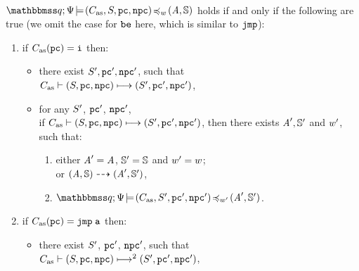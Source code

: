 \begin{definition}
    \label{def:siminsseq}
    \mbox{} \\
    {\em $\simInsSeq{\relastQ}{\Cspec}{(\asmimp, \state, \pc, \npc)}
        {\word}{(\primcom, \hpstate)}$} holds if and only if
    the following are true
    (we omit the case
    for {\em $\be$} here, which is similar to {\em $\jmp$}):

    \small
    \begin{enumerate}[1.]
		\item if {\em $\asmimp(\pc) = \simplins$} then:
		\begin{itemize}
			\item
			there exist {\em $\state', \pc', \npc'$}, such that \\
			{\em $\lptrans{\asmimp}{(\state, \pc, \npc)}{(\state', \pc', \npc')}$},
			
			\item
			for any {\em $\state'$}, {\em $\pc'$}, {\em $\npc'$}, \\ if
            {\em $\lptrans{\asmimp}{(\state, \pc, \npc)}{(\state', \pc', \npc')}$}, then
            there exists {\em $\primcom', \hpstate'$} and {\em $\word'$}, such that:
            \begin{enumerate}[(1)]
                \item either {\em $\primcom' = \primcom$},
                    {\em $\hpstate' = \hpstate$} and {\em $\word' = \word$}; \\
                    or
                    {\em $\primTrans{(\primcom, \hpstate)}
                        {(\primcom', \hpstate')}$},
                \item {\em $\simInsSeq{\relastQ}{\Cspec}
                    {(\asmimp, \state', \pc', \npc')}{\word'}
                    {(\primcom', \hpstate')}$}.
            \end{enumerate}
        \end{itemize}

        \item if {\em $\asmimp(\pc) = \jmp \; \aexp$} then:
            \begin{itemize}
                \item there exist {\em $\state'$}, {\em $\pc'$}, {\em $\npc'$}, such that
                \\
                {\em $\multilptrans{\asmimp}{2}{(\state, \pc, \npc)}
                    {(\state', \pc', \npc')}$},


\end{itemize}
\end{enumerate}
\end{definition}
